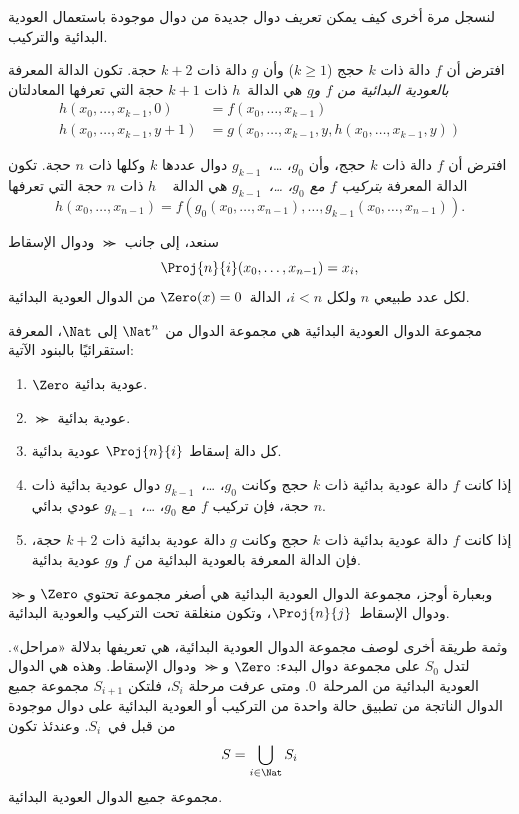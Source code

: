 \documentclass[../../../include/open-logic-section]{subfiles}
\begin{document}

لنسجل مرة أخرى كيف يمكن تعريف دوال جديدة من دوال موجودة باستعمال
العودية البدائية والتركيب.

\begin{defn}
   افترض أن $f$ دالة ذات $k$ حجج
  ($k\ge 1$) وأن $g$ دالة ذات $k+2$ حجة. تكون الدالة المعرفة
  \emph{بالعودية البدائية من $f$ و$g$} هي الدالة~$h$ ذات $k+1$ حجة
  التي تعرفها المعادلتان
  \begin{align*}
    h(x_0,\dots,x_{k-1},0) & =  f(x_0,\dots,x_{k-1}) \\
    h(x_0,\dots,x_{k-1},y+1) & = g(x_0,\dots,x_{k-1}, y, h(x_0,\dots,x_{k-1}, y))
  \end{align*}
\end{defn}

\begin{defn}
   افترض أن $f$ دالة ذات $k$ حجج، وأن
  $g_0$، …،~$g_{k-1}$ دوال عددها $k$ وكلها ذات $n$ حجة. تكون
  الدالة المعرفة \emph{بتركيب $f$ مع $g_0$، …،~$g_{k-1}$} هي الدالة
  ~ $h$ ذات $n$ حجة التي تعرفها
  \[
  h(x_0, \dots, x_{n-1}) =
  f(g_0(x_0, \dots, x_{n-1}), \dots, g_{k-1}(x_0, \dots, x_{n-1})).
  \]
\end{defn}

سنعد، إلى جانب $\Succ$ ودوال الإسقاط
\[
\Proj{n}{i}(x_0,\dots,x_{n-1}) = x_i,
\]
لكل عدد طبيعي $n$ ولكل $i<n$، الدالة~$\Zero(x)=0$ من الدوال العودية
البدائية.

\begin{defn}
  مجموعة الدوال العودية البدائية هي مجموعة الدوال من $\Nat^n$ إلى
  $\Nat$، المعرفة استقرائيًا بالبنود الآتية:
  \begin{enumerate}
  \item $\Zero$ عودية بدائية.
  \item $\Succ$ عودية بدائية.
  \item كل دالة إسقاط $\Proj{n}{i}$ عودية بدائية.
  \item إذا كانت $f$ دالة عودية بدائية ذات $k$ حجج وكانت $g_0$،
    …،~$g_{k-1}$ دوال عودية بدائية ذات $n$ حجة، فإن تركيب $f$ مع
    $g_0$، …،~$g_{k-1}$ عودي بدائي.
  \item إذا كانت $f$ دالة عودية بدائية ذات $k$ حجج وكانت $g$ دالة
    عودية بدائية ذات $k+2$ حجة، فإن الدالة المعرفة بالعودية البدائية
    من $f$ و$g$ عودية بدائية.
\end{enumerate}
\end{defn}

\begin{explain}
وبعبارة أوجز، مجموعة الدوال العودية البدائية هي أصغر مجموعة تحتوي
$\Zero$ و$\Succ$ ودوال الإسقاط~$\Proj{n}{j}$، وتكون منغلقة تحت
التركيب والعودية البدائية.

وثمة طريقة أخرى لوصف مجموعة الدوال العودية البدائية، هي تعريفها بدلالة
«مراحل». لتدل $S_0$ على مجموعة دوال البدء: $\Zero$ و$\Succ$ ودوال
الإسقاط. وهذه هي الدوال العودية البدائية من المرحلة~$0$. ومتى عرفت
مرحلة $S_i$، فلتكن $S_{i+1}$ مجموعة جميع الدوال الناتجة من تطبيق حالة
واحدة من التركيب أو العودية البدائية على دوال موجودة من قبل في~$S_i$.
وعندئذ تكون
\[
S = \bigcup_{i \in \Nat} S_i
\]
مجموعة جميع الدوال العودية البدائية.
\end{explain}
\end{document}
